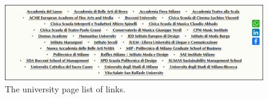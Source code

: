 \begin{itemize}
        \begin{figure}[!ht]
            \includegraphics[width=\linewidth]{images/MC1-1.png}
            \captionsetup{justification=centering}
            \caption{The university page list of links.}
            \label{fig:MC1-1}
        \end{figure}
        
        

\end{itemize}
